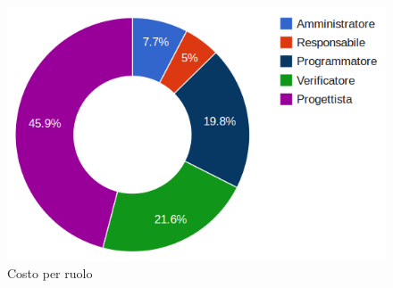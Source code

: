 \begin{figure}[H]
\centering
\includegraphics[scale=0.4]{5-5-2.png}
\caption{Costo per ruolo\label{fig:nome}}
\end{figure}
